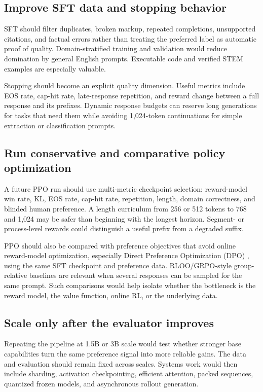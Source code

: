 \documentclass[11pt]{article}
\begin{document}
\subsection{Improve SFT data and stopping behavior}

SFT should filter duplicates, broken markup, repeated completions, unsupported
citations, and factual errors rather than treating the preferred label as
automatic proof of quality. Domain-stratified training and validation would
reduce domination by general English prompts. Executable code and verified
STEM examples are especially valuable.

Stopping should become an explicit quality dimension. Useful metrics include
EOS rate, cap-hit rate, late-response repetition, and reward change between a
full response and its prefixes. Dynamic response budgets can reserve long
generations for tasks that need them while avoiding 1,024-token continuations
for simple extraction or classification prompts.

\subsection{Run conservative and comparative policy optimization}

A future PPO run should use multi-metric checkpoint selection: reward-model
win rate, KL, EOS rate, cap-hit rate, repetition, length, domain correctness,
and blinded human preference. A length curriculum from 256 or 512 tokens to
768 and 1,024 may be safer than beginning with the longest horizon. Segment-
or process-level rewards could distinguish a useful prefix from a degraded
suffix.

PPO should also be compared with preference objectives that avoid online
reward-model optimization, especially Direct Preference Optimization (DPO)
\cite{rafailov2023}, using the same SFT checkpoint and preference data.
RLOO/GRPO-style group-relative baselines are relevant when several responses
can be sampled for the same prompt. Such comparisons would help isolate
whether the bottleneck is the reward model, the value function, online RL, or
the underlying data.

\subsection{Scale only after the evaluator improves}

Repeating the pipeline at 1.5B or 3B scale would test whether stronger base
capabilities turn the same preference signal into more reliable gains. The
data and evaluation should remain fixed across scales. Systems work would then
include sharding, activation checkpointing, efficient attention, packed
sequences, quantized frozen models, and asynchronous rollout generation.
\end{document}
